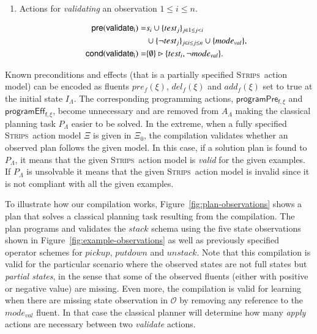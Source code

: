 \documentclass[3p,times]{elsarticle}
\newcommand{\pre}{\mathsf{pre}}  %
\newcommand{\cond}{\mathsf{cond}}   %
\newcommand{\strips}{\textsc{Strips}}     %
\begin{document}
\begin{itemize}
\begin{enumerate}
\item Actions for {\em validating} an observation {\tt\small $1\leq i\leq n$}.
\begin{small}
\begin{align*}
\hspace*{7pt}\pre(\mathsf{validate_{i}})=&s_i\cup\{test_j\}_{j\in 1\leq j<i}\\
&\cup\{\neg test_j\}_{j\in i\leq j\leq n}\cup \{mode_{val}\},\\
\cond(\mathsf{validate_{i}})=&\{\emptyset\}\rhd\{test_i,\neg mode_{val}\}.
\end{align*}
\end{small}
\end{enumerate}
\end{itemize}

Known preconditions and effects (that is a partially specified \strips\ action model) can be encoded as fluents $pre_f(\xi)$, $del_f(\xi)$ and $add_f(\xi)$ set to true at the initial state $I_{\Lambda}$. The corresponding programming actions, $\mathsf{programPre_{f,\xi}}$ and $\mathsf{programEff_{f,\xi}}$, become unnecessary and are removed from $A_{\Lambda}$ making the classical planning task $P_{\Lambda}$ easier to be solved. In the extreme, when a fully specified \strips\ action model $\Xi$ is given in $\Xi_0$, the compilation validates whether an observed plan follows the given model. In this case, if a solution plan is found to $P_{\Lambda}$, it means that the given \strips\ action model is {\em valid} for the given examples. If $P_{\Lambda}$ is unsolvable it means that the given \strips\ action model is invalid since it is not compliant with all the given examples. %

To illustrate how our compilation works, Figure~\ref{fig:plan-observations} shows a plan that solves a classical planning task resulting from the compilation. The plan programs and validates the $stack$ schema using the five state observations shown in Figure~\ref{fig:example-observations} as well as previously specified operator schemes for $pickup$, $putdown$ and $unstack$. Note that this compilation is valid for the particular scenario where the observed states are not full states but {\em partial states}, in the sense that some of the observed fluents (either with positive or negative value) are missing. Even more, the compilation is valid for learning when there are missing state observation in $\mathcal{O}$ by removing any reference to the $mode_{val}$ fluent. In that case the classical planner will determine how many {\em apply} actions are necessary between two {\em validate} actions.  
\end{document}
